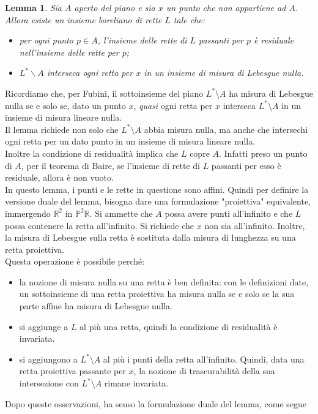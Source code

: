 \documentclass[a4paper, twoside]{article}
\newcommand{\R}{\mathbb{R}}
\renewcommand{\P}{\mathbb{P}}
\newcommand{\<}{\langle}
\renewcommand{\>}{\rangle}
\newtheorem{lemma}[teo]{Lemma}
\begin{document}
\begin{lemma} \label{lemma1}
Sia $A$ aperto del piano e sia $x$ un punto che non appartiene ad $A$. Allora esiste un insieme boreliano di rette $L$ tale che:
\begin{itemize}
	\item per ogni punto $p \in A$, l'insieme delle rette di $L$ passanti per $p$ è residuale nell'insieme delle rette per $p$;
	\item $L^{*} \backslash A$ interseca ogni retta per $x$ in un insieme di misura di Lebesgue nulla.
\end{itemize}
\end{lemma}

Ricordiamo che, per Fubini, il sottoinsieme del piano $L^* \setminus A$ ha misura di Lebesgue nulla se e solo se, dato un punto $x$, \emph{quasi} ogni retta per $x$ interseca $L^* \setminus A$ in un insieme di misura lineare nulla.\\
Il lemma richiede non solo che $L^* \setminus A$ abbia misura nulla, ma anche che intersechi ogni retta per un dato punto in un insieme di misura lineare nulla. \\
Inoltre la condizione di residualità implica che $L$ copre $A$. Infatti preso un punto di $A$, per il teorema di Baire, se l'insieme di rette di $L$ passanti per esso è residuale, allora è non vuoto.\\

In questo lemma, i punti e le rette in questione sono affini. Quindi per definire la versione duale del lemma, bisogna dare una formulazione "proiettiva" equivalente, immergendo $\R^2$ in $\P^2\R$. Si ammette che $A$ possa avere punti all'infinito e che $L$ possa contenere la retta all'infinito. Si richiede che $x$ non sia all'infinito. Inoltre, la misura di Lebesgue sulla retta è sostituta dalla misura di lunghezza su una retta proiettiva.\\
Questa operazione è possibile perché:
\begin{itemize}
	\item la nozione di misura nulla su una retta è ben definita: con le definizioni date, un sottoinsieme di una retta proiettiva ha misura nulla se e solo se la sua parte affine ha misura di Lebesgue nulla. 
	\item si aggiunge a $L$ al più una retta, quindi la condizione di residualità è invariata.
	\item si aggiungono a $L^* \setminus A$ al più i punti della retta all'infinito. Quindi, data una retta proiettiva passante per $x$, la nozione di trascurabilità della sua intersezione con $L^* \setminus A$ rimane invariata.
\end{itemize}
Dopo queste osservazioni, ha senso la formulazione duale del lemma, come segue 
\end{document}
